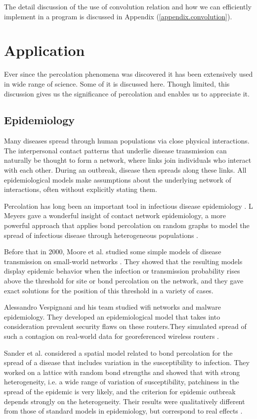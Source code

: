 		The detail discussion of the use of convolution relation and how we can efficiently implement in a program is discussed in Appendix (\ref{appendix.convolution}).



\section{Application}
\label{sect:application}
	Ever since the percolation phenomena was discovered it has been extensively used in wide range of science. Some of it is discussed here. Though limited, this discussion gives us the significance of percolation and enables us to appreciate it.
	\subsection{Epidemiology}
	Many diseases spread through human populations via close physical interactions. The interpersonal contact patterns that underlie disease transmission can naturally be thought to form a network, where links join individuals who interact with each other. During an outbreak, disease then spreads along these links. All epidemiological models make assumptions about the underlying	network of interactions, often without explicitly stating them.
	
	Percolation has long been an important tool in infectious disease epidemiology \cite{Bansal2007}. L Meyers gave a wonderful insight of contact	network epidemiology, a more powerful approach that applies bond percolation on random graphs	to model the spread of infectious disease through heterogeneous populations \cite{Meyers2006}.
	
	Before that	in 2000, Moore et al. studied some simple models of disease transmission on small-world networks \cite{Moore2000}. They showed that the resulting models display epidemic behavior when the infection	or transmission probability rises above the threshold for site or bond percolation on the network,	and they gave exact solutions for the position of this threshold in a variety of cases. 
	
	Alessandro	Vespignani and his team studied wifi networks and malware epidemiology. They developed an	epidemiological model that takes into consideration prevalent security flaws on these routers.They	simulated spread of such a contagion on real-world data for georeferenced wireless routers \cite{Hu2009}.
	
	Sander et al. considered a spatial model related to bond percolation for the spread of a disease that	includes variation in the susceptibility to infection. They worked on a lattice with random bond	strengths and showed that with strong heterogeneity, i.e. a wide range of variation of susceptibility, patchiness in the spread of the epidemic is very likely, and the criterion for epidemic outbreak	depends strongly on the heterogeneity. Their results were qualitatively different from those of standard models in epidemiology, but correspond to real effects \cite{Sander2002}.
	
